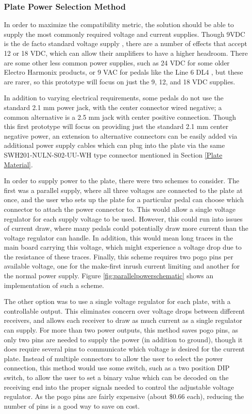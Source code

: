 \documentclass{article}
\begin{document}
		\subsubsection{Plate Power Selection Method}
		In order to maximize the compatibility metric, the solution should be able to supply the most commonly required voltage and current supplies.  Though 9VDC is the de facto standard voltage supply \cite{pedallsit}, there are a number of effects that accept 12 or 18 VDC, which can allow their amplifiers to have a higher headroom.  There are some other less common power supplies, such as 24 VDC for some older Electro Harmonix products, or 9 VAC for pedals like the Line 6 DL4 \cite{Line6DL4manual}, but these are rarer, so this prototype will focus on just the 9, 12, and 18 VDC supplies.

		In addition to varying electrical requirements, some pedals do not use the standard 2.1 mm power jack, with the center connector wired negative; a common alternative is a 2.5 mm jack with center positive connection.  Though this first prototype will focus on providing just the standard 2.1 mm center negative power, an extension to alternative connectors can be easily added via additional power supply cables which can plug into the plate via the same SWH201-NULN-S02-UU-WH type connector mentioned in Section \ref{Plate Material}.

		In order to supply power to the plate, there were two schemes to consider.  The first was a parallel supply, where all three voltages are connected to the plate at once, and the user who sets up the plate for a particular pedal can choose which connector to attach the power connector to.  This would allow a single voltage regulator for each supply voltage to be used.  However, this could run into issues of current draw, where many pedals could potentially draw more current than the voltage regulator can handle.  In addition, this would mean long traces in the main board carrying this voltage, which might experience a voltage drop due to the resistance of these traces.  Finally, this scheme requires two pogo pins per available voltage, one for the make-first inrush current limiting and another for the normal power supply.  Figure \ref{fig:parallelpowerschematic} shows an implementation of such a scheme.

		The other option was to use a single voltage regulator for each plate, with a controllable output.  This eliminates concern over voltage drops between different receivers, and allows each receiver to draw as much current as a single regulator can supply.  For more than two power outputs, this method saves pogo pins, as only two pins are needed to supply the power (in addition to ground), though it does require several pins to communicate which voltage is desired for the current plate.  Instead of multiple connectors to allow the user to select the power connection, this method would use some switch, such as a two position DIP switch, to allow the user to set a binary value which can be decoded on the receiving end into the proper signals needed to control the adjustable voltage regulator.  As the pogo pins are fairly expensive (about \$0.66 each), reducing the number of pins is a good way to save on cost.
\end{document}
